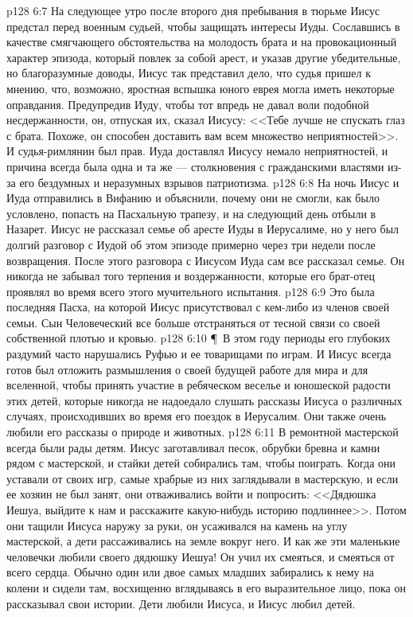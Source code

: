 \vs p128 6:7 На следующее утро после второго дня пребывания в тюрьме Иисус предстал перед военным судьей, чтобы защищать интересы Иуды. Сославшись в качестве смягчающего обстоятельства на молодость брата и на провокационный характер эпизода, который повлек за собой арест, и указав другие убедительные, но благоразумные доводы, Иисус так представил дело, что судья пришел к мнению, что, возможно, яростная вспышка юного еврея могла иметь некоторые оправдания. Предупредив Иуду, чтобы тот впредь не давал воли подобной несдержанности, он, отпуская их, сказал Иисусу: <<Тебе лучше не спускать глаз с брата. Похоже, он способен доставить вам всем множество неприятностей>>. И судья\hyp{}римлянин был прав. Иуда доставлял Иисусу немало неприятностей, и причина всегда была одна и та же --- столкновения с гражданскими властями из\hyp{}за его бездумных и неразумных взрывов патриотизма.
\vs p128 6:8 На ночь Иисус и Иуда отправились в Вифанию и объяснили, почему они не смогли, как было условлено, попасть на Пасхальную трапезу, и на следующий день отбыли в Назарет. Иисус не рассказал семье об аресте Иуды в Иерусалиме, но у него был долгий разговор с Иудой об этом эпизоде примерно через три недели после возвращения. После этого разговора с Иисусом Иуда сам все рассказал семье. Он никогда не забывал того терпения и воздержанности, которые его брат\hyp{}отец проявлял во время всего этого мучительного испытания.
\vs p128 6:9 Это была последняя Пасха, на которой Иисус присутствовал с кем\hyp{}либо из членов своей семьи. Сын Человеческий все больше отстраняться от тесной связи со своей собственной плотью и кровью.
\vs p128 6:10 \P\ В этом году периоды его глубоких раздумий часто нарушались Руфью и ее товарищами по играм. И Иисус всегда готов был отложить размышления о своей будущей работе для мира и для вселенной, чтобы принять участие в ребяческом веселье и юношеской радости этих детей, которые никогда не надоедало слушать рассказы Иисуса о различных случаях, происходивших во время его поездок в Иерусалим. Они также очень любили его рассказы о природе и животных.
\vs p128 6:11 В ремонтной мастерской всегда были рады детям. Иисус заготавливал песок, обрубки бревна и камни рядом с мастерской, и стайки детей собирались там, чтобы поиграть. Когда они уставали от своих игр, самые храбрые из них заглядывали в мастерскую, и если ее хозяин не был занят, они отваживались войти и попросить: <<Дядюшка Иешуа, выйдите к нам и расскажите какую\hyp{}нибудь историю подлиннее>>. Потом они тащили Иисуса наружу за руки, он усаживался на камень на углу мастерской, а дети рассаживались на земле вокруг него. И как же эти маленькие человечки любили своего дядюшку Иешуа! Он учил их смеяться, и смеяться от всего сердца. Обычно один или двое самых младших забирались к нему на колени и сидели там, восхищенно вглядываясь в его выразительное лицо, пока он рассказывал свои истории. Дети любили Иисуса, и Иисус любил детей.
